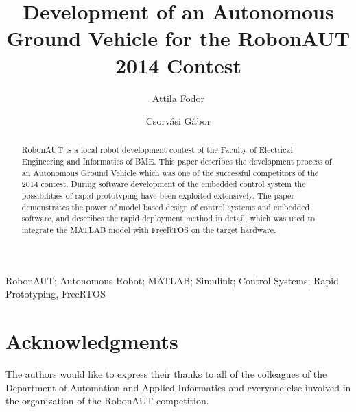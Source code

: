 \documentclass[twoside,b5paper,10pt]{article}
\title{Development of an Autonomous Ground Vehicle for the RobonAUT 2014 Contest}
\author{Attila Fodor \and Csorvási Gábor}
\begin{document}
\makeAutStyleTitle


\begin{abstract}
RobonAUT is a local robot development contest of the Faculty of Electrical Engineering and Informatics of BME. This paper describes the development process of an Autonomous Ground Vehicle which was one of the successful competitors of the 2014 contest. During software development of the embedded control system the possibilities of rapid prototyping have been exploited extensively. The paper demonstrates the power of model based design of control systems and embedded software, and describes the rapid deployment method in detail, which was used to integrate the MATLAB model with FreeRTOS on the target hardware.
\end{abstract}


\begin{keywords}
RobonAUT; Autonomous Robot; MATLAB; Simulink; Control Systems; Rapid Prototyping, FreeRTOS
\end{keywords}






\section*{Acknowledgments}


 { \small The authors would like to express their thanks to all of the colleagues of the Department of Automation and Applied Informatics and everyone else involved in the organization of the RobonAUT competition. }

%

\end{document}
